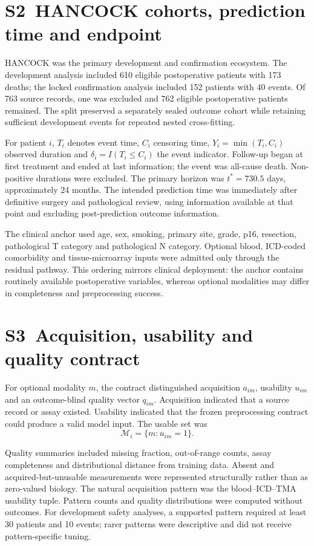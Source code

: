 \section*{S2~HANCOCK cohorts, prediction time and endpoint}
HANCOCK was the primary development and confirmation ecosystem. The development analysis included 610 eligible postoperative patients with 173 deaths; the locked confirmation analysis included 152 patients with 40 events. Of 763 source records, one was excluded and 762 eligible postoperative patients remained. The split preserved a separately sealed outcome cohort while retaining sufficient development events for repeated nested cross-fitting.

For patient $i$, $T_i$ denotes event time, $C_i$ censoring time, $Y_i=\min(T_i,C_i)$ observed duration and $\delta_i=I(T_i\le C_i)$ the event indicator. Follow-up began at first treatment and ended at last information; the event was all-cause death. Non-positive durations were excluded. The primary horizon was $t^*=730.5$ days, approximately 24 months. The intended prediction time was immediately after definitive surgery and pathological review, using information available at that point and excluding post-prediction outcome information.

The clinical anchor used age, sex, smoking, primary site, grade, p16, resection, pathological T category and pathological N category. Optional blood, ICD-coded comorbidity and tissue-microarray inputs were admitted only through the residual pathway. This ordering mirrors clinical deployment: the anchor contains routinely available postoperative variables, whereas optional modalities may differ in completeness and preprocessing success.

\section*{S3~Acquisition, usability and quality contract}
For optional modality $m$, the contract distinguished acquisition $a_{im}$, usability $u_{im}$ and an outcome-blind quality vector $q_{im}$. Acquisition indicated that a source record or assay existed. Usability indicated that the frozen preprocessing contract could produce a valid model input. The usable set was
\begin{equation}
\mathcal{M}_i=\{m:u_{im}=1\}.
\end{equation}

Quality summaries included missing fraction, out-of-range counts, assay completeness and distributional distance from training data. Absent and acquired-but-unusable measurements were represented structurally rather than as zero-valued biology. The natural acquisition pattern was the blood--ICD--TMA usability tuple. Pattern counts and quality distributions were computed without outcomes. For development safety analyses, a supported pattern required at least 30 patients and 10 events; rarer patterns were descriptive and did not receive pattern-specific tuning.

